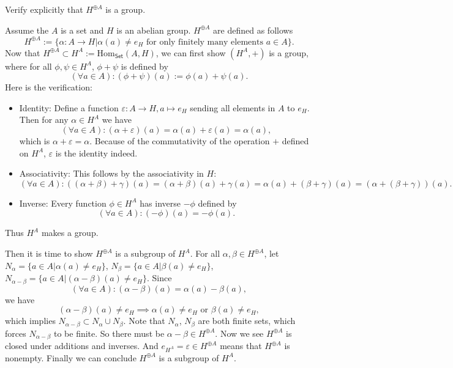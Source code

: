\documentclass[12pt,letterpaper,boxed]{hmcpset}
\newcommand{\Hom}{\mathrm{Hom}}
\begin{document}
\begin{problem}[5.5]
Verify explicitly that $H^{\oplus A}$ is a group.
\end{problem}
\begin{solution}
Assume the $A$ is a set and $H$ is an abelian group. $H^{\oplus A}$ are defined as follows 
\[
H^{\oplus A}:=\{\alpha:A\rightarrow H|\alpha(a)\ne e_H \text{ for only finitely many elements }a\in A\} .
\]
Now that $H^{\oplus A}\subset H^A:=\Hom_{\mathsf{Set}}(A,H)$, we can first show $(H^A,+)$ is a group, where for all $\phi,\psi\in H^A$, $\phi+\psi$ is defined by
\[
(\forall a\in A) : (\phi + \psi)(a) := \phi(a) + \psi(a) .
\]
Here is the verification:
\begin{itemize}
	\item Identity: Define a function $\varepsilon:A\rightarrow H,a\mapsto e_H$ sending all elements in $A$ to $e_H$. Then for any $\alpha\in H^A$ we have
	\[
	(\forall a\in A) : (\alpha + \varepsilon)(a) = \alpha(a) + \varepsilon(a)=\alpha(a),
	\]
	which is $\alpha + \varepsilon=\alpha$. Because of the commutativity of the operation $+$ defined on $H^A$, $\varepsilon$ is the identity indeed.
	\item Associativity: This follows by the associativity in $H$:
	\[
	(\forall a\in A) : ((\alpha + \beta)+\gamma)(a) = (\alpha + \beta)(a) + \gamma(a)= \alpha(a)+ (\beta+ \gamma)(a)=(\alpha +(\beta+\gamma))(a).
	\]
	\item Inverse: Every function $\phi\in H^A$ has inverse $-\phi$ defined by 
	\[
	(\forall a\in A) :(-\phi)(a) = -\phi(a).
	\]
\end{itemize}
	Thus $H^A$ makes a group. 
	
	Then it is time to show $H^{\oplus A}$ is a subgroup of $H^A$. For all $\alpha,\beta\in H^{\oplus A}$, let $N_\alpha=\{a\in A|\alpha(a)\ne e_H\}$, $N_\beta=\{a\in A|\beta(a)\ne e_H\}$, $N_{\alpha-\beta}=\{a\in A|(\alpha - \beta)(a)\ne e_H\}$. Since
	\[
	(\forall a\in A) :(\alpha - \beta)(a) = \alpha(a) - \beta(a),
	\]
	we have 
	\[
	(\alpha - \beta)(a)\ne e_H\implies \alpha(a)\ne e_H\text{ or }\beta(a)\ne e_H,
	\]
	which implies $N_{\alpha-\beta}\subset N_\alpha\cup N_\beta$. Note that $N_\alpha$, $N_\beta$ are both finite sets, which forces $N_{\alpha-\beta}$ to be finite. So there must be $\alpha - \beta\in H^{\oplus A}$. Now we see $H^{\oplus A}$ is closed under additions and inverses. And $e_{H^A}=\varepsilon\in H^{\oplus A}$ means that $H^{\oplus A}$ is nonempty. Finally we can conclude $H^{\oplus A}$ is a subgroup of $H^A$.
\end{solution}
\end{document}
